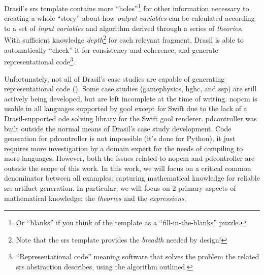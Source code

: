 Drasil's \acs{srs} template contains more ``holes''\footnote{Or ``blanks'' if you
      think of the template as a ``fill-in-the-blanks'' puzzle.} for other
information necessary to creating a whole ``story'' about how
\textit{output variables} can be calculated according to a set of
\textit{input variables} and algorithm derived through a series of
\textit{theories}. With sufficient knowledge \textit{depth}\footnote{Note
      that the \acs{srs} template provides the \textit{breadth} needed by
      design!} for each relevant fragment, Drasil is able to automatically
``check'' it for consistency and coherence, and generate representational
code\footnote{``Representational code'' meaning software that solves the
      problem the related \acs{srs} abstraction describes, using the algorithm
      outlined.}.

Unfortunately, not all of Drasil's case studies are capable of generating
representational code (). Some case studies
(\acs{gamephysics}, \acs{hghc}, and \acs{ssp}) are still actively being
developed, but are left incomplete at the time of writing. \acs{nopcm} is usable
in all languages supported by \acs{gool} except for Swift due to the lack of a
Drasil-supported \acs{ode} solving library for the Swift \acs{gool} renderer.
\acs{pdcontroller} was built \cite{DrasilPR2289Naveen} outside the normal means
of Drasil's case study development. Code generation for \acs{pdcontroller} is
not impossible (it's done for Python), it just requires more investigation by a
domain expert for the needs of compiling to more languages. However, both the
issues related to \acs{nopcm} and \acs{pdcontroller} are outside the scope of
this work. In this work, we will focus on a critical common denominator between
all examples: capturing mathematical knowledge for reliable \acs{srs} artifact
generation. In particular, we will focus on 2 primary aspects of mathematical
knowledge: the \textit{theories} and the \textit{expressions}.

\caseStudiesCodeTable{}
